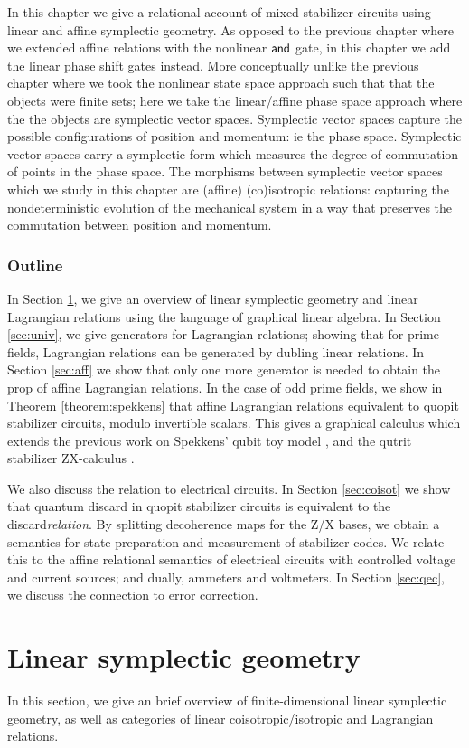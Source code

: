
In this chapter we  give a relational account of mixed stabilizer circuits using linear and affine symplectic geometry. As opposed to the previous chapter where we extended affine relations with the nonlinear $\sf and$ gate, in this chapter we add the linear phase shift gates instead.
More conceptually unlike the previous chapter where we took the nonlinear state space approach such that  that the objects were finite sets; here we take the linear/affine phase space approach where the the objects are symplectic vector spaces.  Symplectic vector spaces capture the possible configurations of position and momentum: ie the phase space.  Symplectic vector spaces carry a symplectic form which measures the degree of commutation of points in the phase space. The morphisms between symplectic vector spaces which we study in this chapter are  (affine) (co)isotropic relations: capturing the nondeterministic evolution of the mechanical system in a way that preserves the commutation between position and momentum.
\subsubsection{Outline}
In Section \ref{sec:sym}, we give an overview of linear symplectic geometry and  linear Lagrangian relations using the language of graphical linear algebra. In Section \ref{sec:univ}, we give generators for Lagrangian relations; showing that for prime fields, Lagrangian relations can be generated by dubling linear relations.
In Section \ref{sec:aff} we show that only one more generator is needed to obtain  the prop of affine Lagrangian relations.  In the case of odd prime fields, we show in Theorem \ref{theorem:spekkens} that affine Lagrangian relations equivalent to quopit stabilizer circuits, modulo invertible scalars.  This gives  a graphical calculus which extends the previous work on Spekkens'  qubit toy model \cite{backensspek}, and the qutrit stabilizer ZX-calculus \cite{qutrit}.  

We also discuss the relation to electrical circuits.
In Section \ref{sec:coisot} we show that quantum discard in quopit stabilizer circuits is equivalent to the discard{\em relation}.
  By splitting decoherence maps for the Z/X bases, we obtain a semantics for state preparation and measurement of stabilizer codes. We relate this to the affine relational semantics of electrical circuits with controlled voltage and current sources; and dually, ammeters and voltmeters.  In Section \ref{sec:qec}, we discuss the connection to error correction.
\section{Linear symplectic geometry}
\label{sec:sym}
In this section, we give an brief overview of finite-dimensional linear symplectic geometry, as well as categories of linear coisotropic/isotropic and Lagrangian relations.

